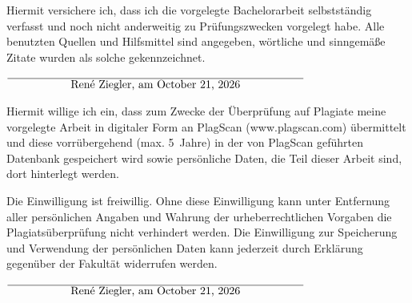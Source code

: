 \documentclass[12pt,oneside,a4paper,parskip]{scrbook}
\def\BaAuthor{René Ziegler}
\begin{document}
\printbibliography
{}



Hiermit versichere ich, dass ich die vorgelegte Bachelorarbeit selbstständig verfasst und noch nicht anderweitig zu Prüfungszwecken vorgelegt habe. Alle benutzten Quellen und Hilfsmittel sind angegeben, wörtliche und sinngemäße Zitate wurden als solche gekennzeichnet.

\vspace{20pt}
\begin{flushright}
$\overline{~~~~~~~~~~~~~~~~~\mbox{\BaAuthor, am \today}~~~~~~~~~~~~~~~~~}$
\end{flushright}


Hiermit willige ich ein, dass zum Zwecke der Überprüfung auf Plagiate meine vorgelegte Arbeit in digitaler Form an PlagScan (www.plagscan.com) übermittelt und diese vorrübergehend (max. 5~Jahre) in der von PlagScan geführten Datenbank gespeichert wird sowie persönliche Daten, die Teil dieser Arbeit sind, dort hinterlegt werden.

\begin{small}
Die Einwilligung ist freiwillig. Ohne diese Einwilligung kann unter Entfernung aller persönlichen Angaben und Wahrung der urheberrechtlichen Vorgaben die Plagiatsüberprüfung nicht verhindert werden. Die Einwilligung zur Speicherung und Verwendung der persönlichen Daten kann jederzeit durch Erklärung gegenüber der Fakultät widerrufen werden.
\end{small}

\vspace{20pt}
\begin{flushright}
$\overline{~~~~~~~~~~~~~~~~~\mbox{\BaAuthor, am \today}~~~~~~~~~~~~~~~~~}$
\end{flushright}
\end{document}
